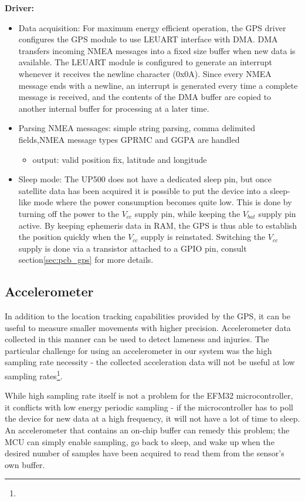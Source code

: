 \textbf{Driver:}
\begin{itemize}
\item{Data acquisition:}
For maximum energy efficient operation, the GPS driver configures the GPS module to use LEUART interface with DMA. DMA transfers incoming NMEA messages into a fixed size buffer when new data is available. The LEUART module is configured to generate an interrupt whenever it receives the newline character (0x0A). Since every NMEA message ends with a newline, an interrupt is generated every time a complete message is received, and the contents of the DMA buffer are copied to another internal buffer for processing at a later time.

\item{Parsing NMEA messages:} \TODO{} simple string parsing, comma delimited fields,NMEA message types GPRMC and GGPA are handled
\begin{itemize}
\item output: valid position fix, latitude and longitude
\end{itemize}

\item{Sleep mode:} The UP500 does not have a dedicated sleep pin, but once satellite data has been acquired it is possible to put the device into a sleep-like mode where the power consumption becomes quite low. This is done by turning off the power to the $V_{cc}$ supply pin, while keeping the $V_{bat}$ supply pin active. By keeping ephemeris data in RAM, the GPS is thus able to establish the position quickly when the $V_{cc}$ supply is reinstated. Switching the $V_{cc}$ supply is done via a transistor attached to a GPIO pin, consult section\ref{sec:pcb_gps} for more details.
\end{itemize}


\subsection{Accelerometer}
In addition to the location tracking capabilities provided by the GPS, it can be useful to measure smaller movements with higher precision. Accelerometer data collected in this manner can be used to detect lameness and injuries. The particular challenge for using an accelerometer in our system was the high sampling rate necessity - the collected acceleration data will not be useful at low sampling rates\footnote{}. 

While high sampling rate itself is not a problem for the EFM32 microcontroller, it conflicts with low energy periodic sampling - if the microcontroller has to poll the device for new data at a high frequency, it will not have a lot of time to sleep. An accelerometer that contains an on-chip buffer can remedy this problem; the MCU can simply enable sampling, go back to sleep, and wake up when the desired number of samples have been acquired to read them from the sensor's own buffer.

